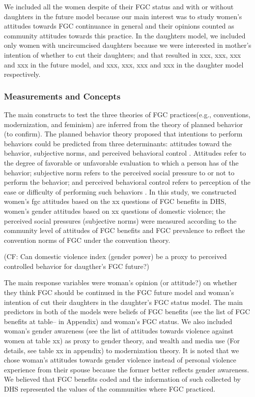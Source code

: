 \documentclass[12pt,]{article}
\begin{document}
We included all the women despite of their FGC status and with or without daughters in the future model because our main interest was to study women's attitudes towards FGC continuance in general and their opinions counted as community attitudes towards this practice.  In the daughters model, we included only women with uncircumcised daughters because we were interested in mother's intention of whether to cut their daughters; and that resulted in xxx, xxx, xxx and xxx in the future model, and xxx, xxx, xxx and xxx in the daughter model respectively.


\subsubsection{Measurements and Concepts}\label{measurements-and-concepts}
The main constructs to test the three theories of FGC practices(e.g., conventions, modernization, and feminism) are inferred from the theory of planned behavior \cite{Ajze91, Ajze02, ThomMadd92} (to confirm).  The planned behavior theory proposed that intentions to perform behaviors could be predicted from three determinants:  attitudes toward the behavior, subjective norms, and perceived behavioral control \cite{Ajze91}.  Attitudes refer to the degree of favorable or unfavorable evaluation to which a person has of the behavior; subjective norm refers to the perceived social pressure to or not to perform the behavior; and perceived behavioral control refers to perception of the ease or difficulty of performing such behaviors \cite{Ajze91}.  In this study, we constructed women's fgc attitudes based on the xx questions of FGC benefits in DHS, women's gender attitudes based on xx questions of domestic violence; the perceived social pressures (subjective norms) were measured according to the community level of attitudes of FGC benefits and FGC prevalence to reflect the convention norms of FGC under the convention theory.

(CF: Can domestic violence index (gender power) be a proxy to perceived controlled behavior for daugther's FGC future?)

The main response variables were woman's opinion (or attitude?) on whether they think FGC should be continued in the FGC future model and woman's intention of cut their daughters in the daughter's FGC status model.  The main predictors in both of the models were beliefs of FGC benefits (see the list of FGC benefits at table-- in Appendix) and woman's FGC status.  We also included woman's gender awareness (see the list of attitudes towards violence against women at table xx) as proxy to gender theory, and wealth and media use (For details, see table xx in appendix) to modernization theory.  It is noted that we chose woman's attitudes towards gender violence instead of personal violence experience from their spouse because the former better reflects gender awareness.  We believed that FGC benefits coded and the information of such collected by DHS represented the values of the communities where FGC practiced.
\end{document}
